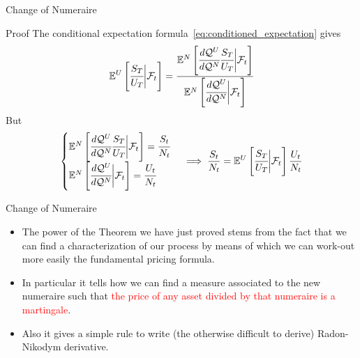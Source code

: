 \documentclass{beamer}
\begin{document}
\begin{frame}{Change of Numeraire}
	\begin{block}{Proof}
	The conditional expectation formula~\ref{eq:conditioned_expectation} gives
	\begin{equation*}
		\mathbb{E}^U\left[\cfrac{S_T}{U_T}\bigg|\mathcal{F}_t\right]=\cfrac{\mathbb{E}^N\left[\cfrac{d\mathcal{Q}^U}{d\mathcal{Q}^N}\cfrac{S_T}{U_T}\bigg|\mathcal{F}_t\right]}{\mathbb{E}^N\left[\cfrac{d\mathcal{Q}^U}{d\mathcal{Q}^N}\bigg|\mathcal{F}_t\right]}
	\end{equation*}
	But 
	\begin{equation*}
		\begin{cases}
		\mathbb{E}^N\left[\cfrac{d\mathcal{Q}^U}{d\mathcal{Q}^N}\cfrac{S_T}{U_T}\bigg|\mathcal{F}_t\right]=\cfrac{S_t}{N_t} \\
		\mathbb{E}^N\left[\cfrac{d\mathcal{Q}^U}{d\mathcal{Q}^N}\bigg|\mathcal{F}_t\right]=\cfrac{U_t}{N_t}
		\end{cases}\implies
		\frac{S_t}{N_t}=\mathbb{E}^U\left[\cfrac{S_T}{U_T}\bigg|\mathcal{F}_t\right]\frac{U_t}{N_t}
	\end{equation*}
    \end{block}
\end{frame}	

\begin{frame}{Change of Numeraire}
	\begin{itemize}
		\item The power of the Theorem we have just proved stems from the fact that we can find a characterization of our process by means of which we can work-out more easily the fundamental pricing formula.
		\item In particular it tells how we can find a measure associated to the new numeraire such that \textcolor{red}{the price of any asset divided by that numeraire is a martingale}.
		\item Also it gives a simple rule to write (the otherwise difficult to derive) Radon-Nikodym derivative.
	\end{itemize}
\end{frame}
\end{document}
